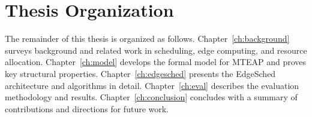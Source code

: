 \section{Thesis Organization}

The remainder of this thesis is organized as follows. Chapter~\ref{ch:background} surveys background and related work in scheduling, edge computing, and resource allocation. Chapter~\ref{ch:model} develops the formal model for MTEAP and proves key structural properties. Chapter~\ref{ch:edgesched} presents the EdgeSched architecture and algorithms in detail. Chapter~\ref{ch:eval} describes the evaluation methodology and results. Chapter~\ref{ch:conclusion} concludes with a summary of contributions and directions for future work.
